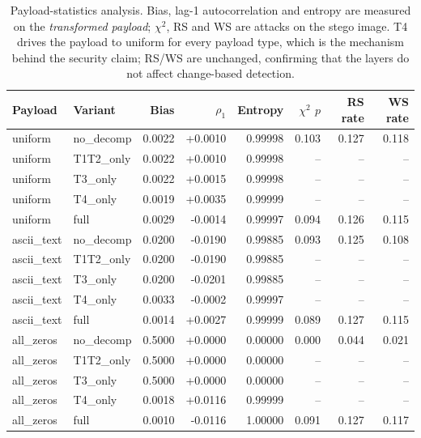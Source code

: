\begin{table}[!t]
\centering
\caption{Payload-statistics analysis. Bias, lag-1 autocorrelation and entropy are measured on the \emph{transformed payload}; $\chi^2$, RS and WS are attacks on the stego image. T4 drives the payload to uniform for every payload type, which is the mechanism behind the security claim; RS/WS are unchanged, confirming that the layers do not affect change-based detection.}
\label{tab:targeted}
\footnotesize
\begin{tabular}{llrrrrrr}
\toprule
Payload & Variant & Bias & $\rho_1$ & Entropy & $\chi^2$ $p$ & RS rate & WS rate \\
\midrule
uniform & no\_decomp & 0.0022 & +0.0010 & 0.99998 & 0.103 & 0.127 & 0.118 \\
uniform & T1T2\_only & 0.0022 & +0.0010 & 0.99998 & -- & -- & -- \\
uniform & T3\_only & 0.0022 & +0.0015 & 0.99998 & -- & -- & -- \\
uniform & T4\_only & 0.0019 & +0.0035 & 0.99999 & -- & -- & -- \\
uniform & full & 0.0029 & -0.0014 & 0.99997 & 0.094 & 0.126 & 0.115 \\
ascii\_text & no\_decomp & 0.0200 & -0.0190 & 0.99885 & 0.093 & 0.125 & 0.108 \\
ascii\_text & T1T2\_only & 0.0200 & -0.0190 & 0.99885 & -- & -- & -- \\
ascii\_text & T3\_only & 0.0200 & -0.0201 & 0.99885 & -- & -- & -- \\
ascii\_text & T4\_only & 0.0033 & -0.0002 & 0.99997 & -- & -- & -- \\
ascii\_text & full & 0.0014 & +0.0027 & 0.99999 & 0.089 & 0.127 & 0.115 \\
all\_zeros & no\_decomp & 0.5000 & +0.0000 & 0.00000 & 0.000 & 0.044 & 0.021 \\
all\_zeros & T1T2\_only & 0.5000 & +0.0000 & 0.00000 & -- & -- & -- \\
all\_zeros & T3\_only & 0.5000 & +0.0000 & 0.00000 & -- & -- & -- \\
all\_zeros & T4\_only & 0.0018 & +0.0116 & 0.99999 & -- & -- & -- \\
all\_zeros & full & 0.0010 & -0.0116 & 1.00000 & 0.091 & 0.127 & 0.117 \\
\bottomrule
\end{tabular}
\end{table}
